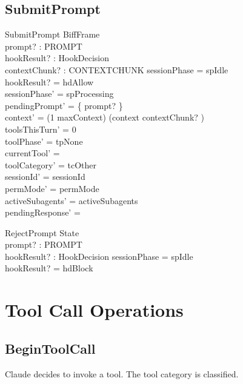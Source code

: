 \documentclass[a4paper,10pt,fleqn]{article}
\begin{document}
\subsection{SubmitPrompt}

\begin{schema}{SubmitPrompt}
  BiffFrame \\
  prompt? : PROMPT \\
  hookResult? : HookDecision \\
  contextChunk? : CONTEXTCHUNK
  \where
  sessionPhase = spIdle \\
  hookResult? = hdAllow \\
  sessionPhase' = spProcessing \\
  pendingPrompt' = \{ prompt? \} \\
  context' = (1 \upto maxContext) \dres (context \cat \langle contextChunk? \rangle) \\
  toolsThisTurn' = 0 \\
  toolPhase' = tpNone \\
  currentTool' = \emptyset \\
  toolCategory' = tcOther \\
  sessionId' = sessionId \\
  permMode' = permMode \\
  activeSubagents' = activeSubagents \\
  pendingResponse' = \emptyset
\end{schema}

\begin{schema}{RejectPrompt}
  \Xi State \\
  prompt? : PROMPT \\
  hookResult? : HookDecision
  \where
  sessionPhase = spIdle \\
  hookResult? = hdBlock
\end{schema}

\section{Tool Call Operations}

\subsection{BeginToolCall}

Claude decides to invoke a tool. The tool category is classified.
\end{document}
